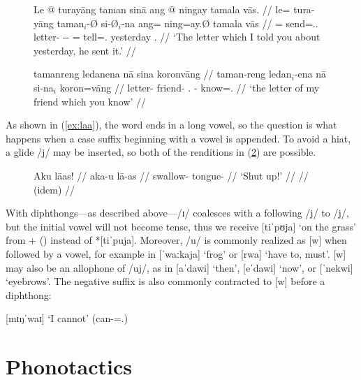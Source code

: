 \begin{figure}[h]
\pex\label{ex:relmorphophon}
\a\label{ex:relmorphophon_1}%
\begingl
	\gla Le @ turayāng taman sinā ang @ ningay tamala vās. //
	\glb le= tura-yāng taman$_i$-Ø si-Ø$_i$-na ang= ning=ay.Ø 
		tamala vās //
	\glc \PatTI{}= send=\Tsg{}.\M{}.\Aarg{} letter-\Top{} 
		\Rel{}-\PatTI{}-\Gen{} \AgtT{}= tell=\Fsg{}.\Top{} yesterday 
		\Ssg{}.\Parg{} //
	\glft `The letter which I told you about yesterday, he sent it.' //
\endgl

\a\label{ex:relmorphophon_2}%
\begingl
	\gla tamanreng ledanena nā sina koronvāng //
	\glb taman-reng ledan$_i$-ena nā si-na$_i$ koron=vāng //
	\glc letter-\AargI{} friend-\Gen{} \Fsg.\Gen{} \Rel{}-\Gen{} 
		know=\Ssg{}.\Aarg{} //
	\glft `the letter of my friend which you know' //
\endgl
\xe
\end{figure}

As shown in (\ref{ex:laa}), the word  ends in a long
vowel, so the question is what happens when a case suffix beginning with a
vowel is appended. To avoid a hiat, a glide /j/ may be inserted, so both of the
renditions in (\ref{ex:hiat}) are possible.

\begin{figure}[h]
\pex\label{ex:hiat}
	\a\begingl
		\gla Aku lāas! //
		\glb aka-u lā-as //
		\glc swallow-\Imp{} tongue-\Parg{} //
		\glft `Shut up!' //
	\endgl
	\a\begingl
		 //
		\glft (idem) //
	\endgl
\xe
\end{figure}

With diphthongs---as described above---/ɪ/ coalesces with a following /j/ to
/j/, but the initial vowel will not become tense, thus we receive
 [tiˈpʊja] `on the grass' from
 +  (\Loc{}) instead of *[tiˈpuja].
Moreover, /u/ is commonly realized as [w] when followed by a vowel, for example
in  [ˈwaːkaja] `frog' or  [rwa] `have
to, must'. [w] may also be an allophone of /uj/, as in 
[aˈdawi] `then',  [eˈdawi] `now', or 
[ˈnekwi] `eyebrows'. The negative suffix  is also commonly
contracted to [w] before a diphthong:

\ex
	 [mɪŋˈwaɪ] 
		`I cannot' (can-\Neg{}=\Fsg{}.\Top{})
\xe

%
%

\section{Phonotactics}
\label{sec:phonotactics}

